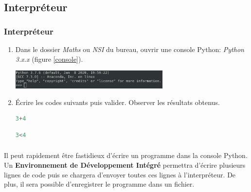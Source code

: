 \documentclass[svgnames,11pt]{beamer}
\begin{document}
\subsection{Interpréteur}
\begin{frame}[fragile]
    \frametitle{Interpréteur}
    \begin{activite}
        \begin{enumerate}
            \item Dans le dossier \emph{Maths} ou \emph{NSI} du bureau, ouvrir une console Python: \emph{Python 3.x.x} (figure \ref{console}).
                  \begin{center}
                      \centering
                      \includegraphics[width=8cm]{ressources/console.png}
                      \label{console}
                  \end{center}
            \item Écrire les codes suivants puis valider. Observer les résultats obtenus.
                  \begin{center}
                      \begin{lstlisting}[language=Python , basicstyle=\ttfamily\small, xleftmargin=2em, xrightmargin=2em]
3+4
\end{lstlisting}
                      \begin{lstlisting}[language=Python , basicstyle=\ttfamily\small, xleftmargin=2em, xrightmargin=2em]
3<4
\end{lstlisting}
                  \end{center}
        \end{enumerate}
    \end{activite}


\end{frame}
\begin{frame}
    \frametitle{}
    Il peut rapidement être fastidieux d'écrire un programme dans la console Python. Un \textbf{Environnement de Développement Intégré} permettra d'écrire plusieurs lignes de code puis se chargera d'envoyer toutes ces lignes à l'interpréteur. De plus, il sera possible d'enregistrer le programme dans un fichier.

\end{frame}
\end{document}

